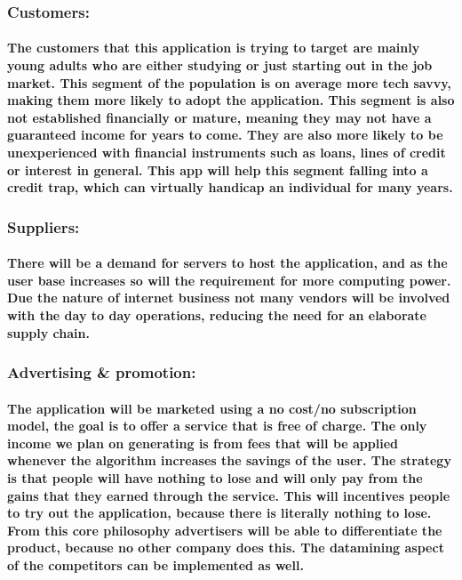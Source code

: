 \documentclass{article}
\begin{document}
\subsubsection{Customers:}
\paragraph{\indent The customers that this application is trying to target are mainly young adults who are either studying or just starting out in the job market.  This segment of the population is on average more tech savvy, making them more likely to adopt the application.  This segment is also not established financially or mature, meaning they may not have a guaranteed income for years to come.  They are also more likely to be unexperienced with financial instruments such as loans, lines of credit or interest in general.  This app will help this segment falling into a credit trap, which can virtually handicap an individual for many years.}

\subsubsection{Suppliers:}
\paragraph{\indent There will be a demand for servers to host the application, and as the user base increases so will the requirement for more computing power.  Due the nature of internet business not many vendors will be involved with the day to day operations, reducing the need for an elaborate supply chain.}

\subsubsection{Advertising & promotion:}
\paragraph{\indent The application will be marketed using a no cost/no subscription model, the goal is to offer a service that is free of charge.  The only income we plan on generating is from fees that will be applied whenever the algorithm increases the savings of the user.  The strategy is that people will have nothing to lose and will only pay from the gains that they earned through the service.  This will incentives people to try out the application, because there is literally nothing to lose.  From this core philosophy advertisers will be able to differentiate the product, because no other company does this.  The datamining aspect of the competitors can be implemented as well.}
\end{document}
